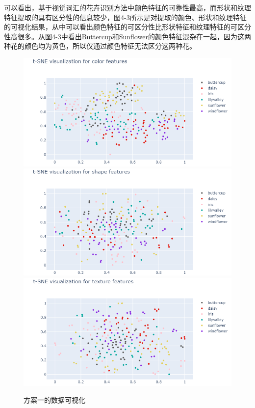 \documentclass[supercite]{HustGraduPaper}
\begin{document}
\begin{sloppypar}
      可以看出，基于视觉词汇的花卉识别方法中颜色特征的可靠性最高，而形状和纹理特征提取的具有区分性的信息较少，图4-3所示是对提取的颜色、形状和纹理特征的可视化结果，从中可以看出颜色特征的可区分性比形状特征和纹理特征的可区分性高很多。从图4-3中看出Buttercup和Sunflower的颜色特征混杂在一起，因为这两种花的颜色均为黄色，所以仅通过颜色特征无法区分这两种花。
      \begin{figure}[H]
        \begin{minipage}[t]{\textwidth}
        \centering
         \includegraphics[scale=0.7]{1.png}
         \includegraphics[scale=0.7]{2.png}
         \includegraphics[scale=0.7]{3.png}
         \end{minipage}
       \caption{方案一的数据可视化}
       \end{figure}
      

\end{sloppypar}
\end{document}
